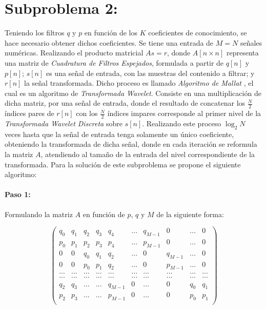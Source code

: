 \documentclass[11pt]{article}
\begin{document}
\section*{Subproblema 2:}
Teniendo los filtros \(q\) y \(p\) en función de los \(K\) coeficientes de conocimiento, se hace necesario obtener dichos coeficientes. Se tiene una entrada de \(M = N\) 
señales numéricas. Realizando el producto matricial \(As = r\), donde \(A[n \times n]\) representa una matriz de {\it Cuadratura de Filtros Espejados}, formulada a partir de 
\(q[n]\) y \(p[n]\); \(s[n]\) es una señal de entrada, con las muestras del contenido a filtrar; y \(r[n]\) la señal transformada. Dicho proceso es llamado {\it Algoritmo 
de Mallat} \cite{mallat}, el cual es un algoritmo de {\it Transformada Wavelet}. Consiste en una multiplicación de dicha matriz, por una señal de entrada, donde el resultado de concatenar 
los \(\frac{N}{2}\) índices pares de \(r[n]\) con los \(\frac{N}{2}\) índices impares corresponde al primer nivel de la {\it Transformada Wavelet Discreta} sobre \(s[n]\). Realizando este proceso \(\log_{2}{N}\) 
veces hasta que la señal de entrada tenga solamente un único coeficiente, obteniendo la transformada de dicha señal, donde en cada iteración se reformula la matriz \(A\), atendiendo al tamaño de la entrada 
del nivel correspondiente de la transformada. Para la solución de este subproblema se propone el siguiente algoritmo:


\paragraph*{Paso 1:}
Formulando la matriz \(A\) en función de \(p\), \(q\) y \(M\) de la siguiente forma:

\begin{equation}
    \begin{pmatrix}
        q_0 & q_1 & q_2 & q_3 & q_4 & ... & q_{M - 1} & 0 & ... & 0\\ 
        p_0 & p_1 & p_2 & p_3 & p_4 & ... & p_{M - 1} & 0 & ... & 0\\ 
        0 & 0 & q_0 & q_1 & q_2 & ... & 0 & q_{M - 1} & ... & 0\\ 
        0 & 0 & p_0 & p_1 & q_2 & ... & 0 & p_{M - 1} & ... & 0\\ 
        ... & ... & ... & ... & ... & ... & ... & ... & ... & ...\\
        ... & ... & ... & ... & ... & ... & ... & ... & ... & ...\\
        q_2 & q_3 & ... & ... & q_{M - 1} & 0 &... & 0 & q_0 & q_1\\
        p_2 & p_3 & ... & ... & p_{M - 1} & 0 &... & 0 & p_0 & p_1\\
    \end{pmatrix}
\end{equation}
\end{document}
